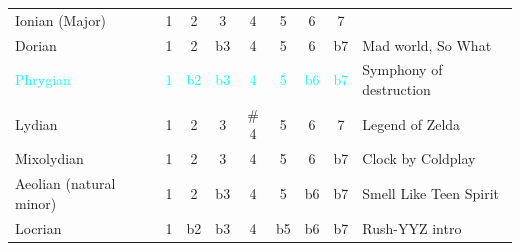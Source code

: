 \documentclass{article}
\begin{document}
\begin{table}[!h]
\begin{adjustwidth}{-2.5cm}{}
\begin{tabular}{l|ccc cccc|l}
		\textcolor{yellow!90!black}{Ionian (Major)}  & \textcolor{yellow!90!black}{1}  
											  		  & \textcolor{yellow!90!black}{2}  
											  		  & \textcolor{yellow!90!black}{3}  
											  		  & \textcolor{yellow!90!black}{4} 
											  		  & \textcolor{yellow!90!black}{5}  
											  		  & \textcolor{yellow!90!black}{6} 
											  		  & \textcolor{yellow!90!black}{7} & \\ 
		\textcolor{green!60!white!70!black}{Dorian}  & \textcolor{green!60!white!70!black}{1} 
													  & \textcolor{green!60!white!70!black}{2} 
													  & \textcolor{green!60!white!70!black}{b3} 
													  & \textcolor{green!60!white!70!black}{4} 
													  & \textcolor{green!60!white!70!black}{5}  
													  & \textcolor{green!60!white!70!black}{6} 
													  & \textcolor{green!60!white!70!black}{b7} & Mad world, So What \\ 
		\textcolor{cyan}{Phrygian}                   & \textcolor{cyan}{1} 
													  & \textcolor{cyan}{b2} 
													  & \textcolor{cyan}{b3} 
													  & \textcolor{cyan}{4} 
													  & \textcolor{cyan}{5}  
													  & \textcolor{cyan}{b6} 
													  & \textcolor{cyan}{b7} & Symphony of destruction\\ 
		\textcolor{blue!50!white}{Lydian}            & \textcolor{blue!50!white}{1} 
													  & \textcolor{blue!50!white}{2}
													  & \textcolor{blue!50!white}{3}  
													  & \textcolor{blue!50!white}{$\#$4} 
													  & \textcolor{blue!50!white}{5}  
													  & \textcolor{blue!50!white}{6}  
													  & \textcolor{blue!50!white}{7}  
													  &  Legend of Zelda\\ 
		\textcolor{blue!50!red!50!white}{Mixolydian} & \textcolor{blue!50!red!50!white}{1} 
													  & \textcolor{blue!50!red!50!white}{2} 
													  & \textcolor{blue!50!red!50!white}{3} 
													  & \textcolor{blue!50!red!50!white}{4}    
													  & \textcolor{blue!50!red!50!white}{5}
													  & \textcolor{blue!50!red!50!white}{6}
													  & \textcolor{blue!50!red!50!white}{b7}
													  & Clock by Coldplay\\ 
		\textcolor{red!60!white}{Aeolian (natural minor)} & \textcolor{red!60!white}{1} 
													  & \textcolor{red!60!white}{2} 
													  & \textcolor{red!60!white}{b3} 
													  & \textcolor{red!60!white}{4}      
													  & \textcolor{red!60!white}{5}   
													  & \textcolor{red!60!white}{b6} 
													  & \textcolor{red!60!white}{b7} 
													  & Smell Like Teen Spirit\\
		\textcolor{orange!80!white}{Locrian}         & \textcolor{orange!80!white}{1}
													  & \textcolor{orange!80!white}{b2} 
													  & \textcolor{orange!80!white}{b3}
													  & \textcolor{orange!80!white}{4}   
													  & \textcolor{orange!80!white}{b5}
													  & \textcolor{orange!80!white}{b6}
													  & \textcolor{orange!80!white}{b7}
													  & Rush-YYZ intro\\ 
		

\end{tabular}
\end{adjustwidth}
\end{table}
\end{document}
